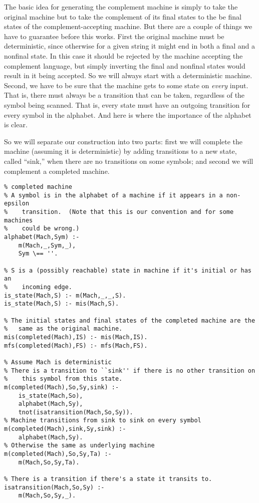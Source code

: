 The basic idea for generating the complement machine is simply to take
the original machine but to take the complement of its final states to
the be final states of the complement-accepting machine.  But there
are a couple of things we have to guarantee before this works.  First
the original machine must be deterministic, since otherwise for a
given string it might end in both a final and a nonfinal state.  In
this case it should be rejected by the machine accepting the
complement language, but simply inverting the final and nonfinal
states would result in it being accepted.  So we will always start
with a deterministic machine.  Second, we have to be sure that the
machine gets to some state on {\em every} input.  That is, there must
always be a transition that can be taken, regardless of the symbol
being scanned.  That is, every state must have an outgoing transition
for every symbol in the alphabet.  And here is where the importance of
the alphabet is clear.

So we will separate our construction into two parts: first we will
complete the machine (assuming it is deterministic) by adding
transitions to a new state, called ``sink,'' when there are no
transitions on some symbols; and second we will complement a completed
machine.

\begin{verbatim}
% completed machine
% A symbol is in the alphabet of a machine if it appears in a non-epsilon 
%    transition.  (Note that this is our convention and for some machines
%    could be wrong.)
alphabet(Mach,Sym) :- 
    m(Mach,_,Sym,_),
    Sym \== ''.

% S is a (possibly reachable) state in machine if it's initial or has an
%    incoming edge.
is_state(Mach,S) :- m(Mach,_,_,S).
is_state(Mach,S) :- mis(Mach,S).

% The initial states and final states of the completed machine are the
%   same as the original machine.
mis(completed(Mach),IS) :- mis(Mach,IS).
mfs(completed(Mach),FS) :- mfs(Mach,FS).

% Assume Mach is deterministic
% There is a transition to ``sink'' if there is no other transition on
%    this symbol from this state.
m(completed(Mach),So,Sy,sink) :-
    is_state(Mach,So),
    alphabet(Mach,Sy),
    tnot(isatransition(Mach,So,Sy)).
% Machine transitions from sink to sink on every symbol
m(completed(Mach),sink,Sy,sink) :-
    alphabet(Mach,Sy).
% Otherwise the same as underlying machine
m(completed(Mach),So,Sy,Ta) :-
    m(Mach,So,Sy,Ta).
	
% There is a transition if there's a state it transits to.
isatransition(Mach,So,Sy) :-
    m(Mach,So,Sy,_).
\end{verbatim}

